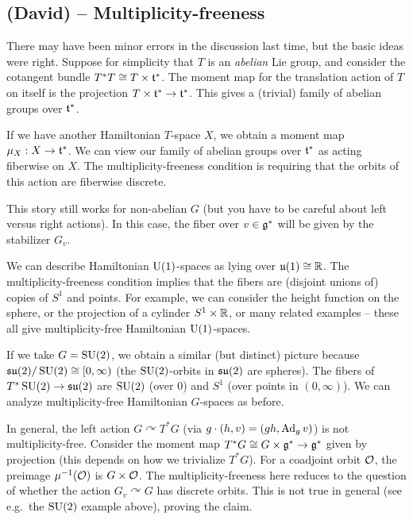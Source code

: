 \documentclass{article}
\begin{document}
\subsection{(David) -- Multiplicity-freeness}

There may have been minor errors in the discussion last time, but the basic ideas were right.
Suppose for simplicity that $T$ is an \emph{abelian} Lie group, and consider the cotangent bundle $T^*T \cong T \times \mathfrak{t}^*$.
The moment map for the translation action of $T$ on itself is the projection $T \times \mathfrak{t}^* \to \mathfrak{t}^*$.
This gives a (trivial) family of abelian groups over $\mathfrak{t}^*$.

If we have another Hamiltonian $T$-space $X$, we obtain a moment map $\mu_X: X \to \mathfrak{t}^*$.
We can view our family of abelian groups over $\mathfrak{t}^*$ as acting fiberwise on $X$.
The multiplicity-freeness condition is requiring that the orbits of this action are fiberwise discrete.

This story still works for non-abelian $G$ (but you have to be careful about left versus right actions).
In this case, the fiber over $v \in \mathfrak{g}^*$ will be given by the stabilizer $G_v$.

\begin{ex}
	We can describe Hamiltonian $\operatorname{U}(1)$-spaces as lying over $\mathfrak{u}(1) \cong \mathbb{R}$.
	The multiplicity-freeness condition implies that the fibers are (disjoint unions of) copies of $S^1$ and points.
	For example, we can consider the height function on the sphere, or the projection of a cylinder $S^1 \times \mathbb{R}$, or many related examples -- these all give multiplicity-free Hamiltonian $\operatorname{U}(1)$-spaces.
\end{ex}

\begin{ex}
	If we take $G = \operatorname{SU}(2)$, we obtain a similar (but distinct) picture because $\mathfrak{su}(2) / \operatorname{SU}(2) \cong [0, \infty)$ (the $\operatorname{SU}(2)$-orbits in $\mathfrak{su}(2)$ are spheres).
	The fibers of $T^*\operatorname{SU}(2) \to \mathfrak{su}(2)$ are $\operatorname{SU}(2)$ (over $0$) and $S^1$ (over points in $(0, \infty)$).
	We can analyze multiplicity-free Hamiltonian $G$-spaces as before.
\end{ex}

In general, the left action $G \curvearrowright T^*G$ (via $g \cdot (h, v) = (gh, \operatorname{Ad}_g v)$) is not multiplicity-free.
Consider the moment map $T^*G \cong G \times \mathfrak{g}^* \to \mathfrak{g}^*$ given by projection (this depends on how we trivialize $T^*G$).
For a coadjoint orbit $\mathcal{O}$, the preimage $\mu^{-1}(\mathcal{O})$ is $G \times \mathcal{O}$.
The multiplicity-freeness here reduces to the question of whether the action $G_v \curvearrowright G$ has discrete orbits.
This is not true in general (see e.g.\ the $\operatorname{SU}(2)$ example above), proving the claim.
\end{document}
